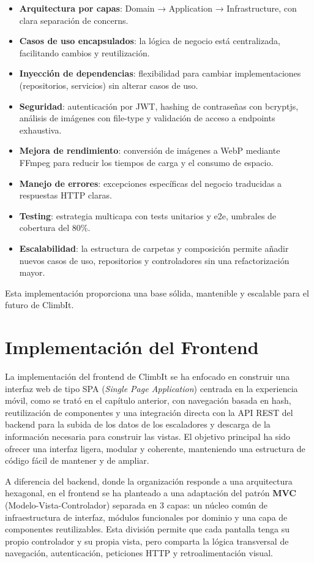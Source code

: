 \begin{itemize}
  \item \textbf{Arquitectura por capas}: Domain → Application → Infrastructure, con clara separación de concerns.
  \item \textbf{Casos de uso encapsulados}: la lógica de negocio está centralizada, facilitando cambios y reutilización.
  \item \textbf{Inyección de dependencias}: flexibilidad para cambiar implementaciones (repositorios, servicios) sin alterar casos de uso.
  \item \textbf{Seguridad}: autenticación por JWT, hashing de contraseñas con bcryptjs, análisis de imágenes con file-type 
  y validación de acceso a endpoints exhaustiva.
  \item \textbf{Mejora de rendimiento}: conversión de imágenes a WebP mediante FFmpeg para reducir los tiempos de carga 
  y el consumo de espacio.
  \item \textbf{Manejo de errores}: excepciones específicas del negocio traducidas a respuestas HTTP claras.
  \item \textbf{Testing}: estrategia multicapa con tests unitarios y e2e, umbrales de cobertura del 80\%.
  \item \textbf{Escalabilidad}: la estructura de carpetas y composición permite añadir nuevos casos de uso, repositorios y 
  controladores sin una refactorización mayor.
\end{itemize}


Esta implementación proporciona una base sólida, mantenible y escalable para el futuro de ClimbIt.


\section{Implementación del Frontend}

La implementación del frontend de ClimbIt se ha enfocado en construir una interfaz web de tipo SPA (\textit{Single Page Application}) centrada en la experiencia móvil, como se trató en el capítulo anterior, con navegación basada en hash, reutilización de componentes y una integración directa con la API REST del backend para la subida de los datos de los escaladores y descarga de la información necesaria para construir las vistas. El objetivo principal ha sido ofrecer una interfaz ligera, modular y coherente, manteniendo una estructura de código fácil de mantener y de ampliar.

A diferencia del backend, donde la organización responde a una arquitectura hexagonal, en el frontend se ha planteado a una adaptación del patrón \textbf{MVC} (Modelo-Vista-Controlador) separada en 3 capas: un núcleo común de infraestructura de interfaz, módulos funcionales por dominio y una capa de componentes reutilizables. Esta división permite que cada pantalla tenga su propio controlador y su propia vista, pero comparta la lógica transversal de navegación, autenticación, peticiones HTTP y retroalimentación visual.

